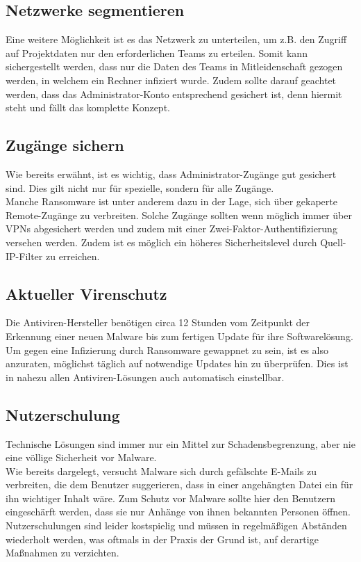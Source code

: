 \subsection{Netzwerke segmentieren}
	Eine weitere Möglichkeit ist es das Netzwerk zu unterteilen, um z.B. den Zugriff auf Projektdaten nur den erforderlichen Teams zu erteilen. Somit kann sichergestellt werden, dass nur die Daten des Teams in Mitleidenschaft gezogen werden, in welchem ein Rechner infiziert wurde. Zudem sollte darauf geachtet werden, dass das Administrator-Konto entsprechend gesichert ist, denn hiermit steht und fällt das komplette Konzept. \cite{bsi:ransome}
	
\subsection{Zugänge sichern}
Wie bereits erwähnt, ist es wichtig, dass Administrator-Zugänge gut gesichert sind. Dies gilt nicht nur für spezielle, sondern für alle Zugänge. \\
Manche Ransomware ist unter anderem dazu in der Lage, sich über gekaperte Remote-Zugänge zu verbreiten. Solche Zugänge sollten wenn möglich immer über VPNs abgesichert werden und zudem mit einer Zwei-Faktor-Authentifizierung versehen werden. Zudem ist es möglich ein höheres Sicherheitslevel durch Quell-IP-Filter zu erreichen. \cite{bsi:ransome}
	
\subsection{Aktueller Virenschutz}
Die Antiviren-Hersteller benötigen circa 12 Stunden vom Zeitpunkt der Erkennung einer neuen Malware bis zum fertigen Update für ihre Softwarelösung. Um gegen eine Infizierung durch Ransomware gewappnet zu sein, ist es also anzuraten, möglichst täglich auf notwendige Updates hin zu überprüfen. Dies ist in nahezu allen Antiviren-Lösungen auch automatisch einstellbar.

\subsection{Nutzerschulung}
Technische Lösungen sind immer nur ein Mittel zur Schadensbegrenzung, aber nie eine völlige Sicherheit vor Malware. \\
Wie bereits dargelegt, versucht Malware sich durch gefälschte E-Mails zu verbreiten, die dem Benutzer suggerieren, dass in einer angehängten Datei ein für ihn wichtiger Inhalt wäre. Zum Schutz vor Malware sollte hier den Benutzern eingeschärft werden, dass sie nur Anhänge von ihnen bekannten Personen öffnen. \\
Nutzerschulungen sind leider kostspielig und müssen in regelmäßigen Abständen wiederholt werden, was oftmals in der Praxis der Grund ist, auf derartige Maßnahmen zu verzichten.


